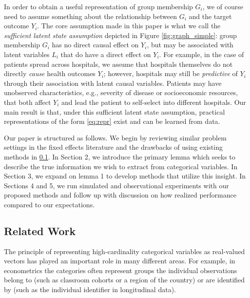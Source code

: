 \documentclass{article}
\theoremstyle{plain}
\theoremstyle{definition}
\theoremstyle{remark}
\begin{document}
In order to obtain a useful representation of group membership $G_i$, we of course need to assume
something about the relationship between $G_i$ and the target outcome $Y_i$. The core assumption
made in this paper is what we call the \emph{sufficient latent state assumption} depicted in Figure
\ref{fig:graph_simple}: group membership $G_i$ has no direct causal effect on $Y_i$, but may be
associated with latent variables $L_i$ that do have a direct effect on $Y_i$.
For example, in the case of patients spread across hospitals, we assume that hospitals themselves do not
directly \emph{cause} health outcomes $Y_i$; however, hospitals may still be \emph{predictive} of
$Y_i$ through their association with latent causal variables. Patients may have unobserved
characteristics, e.g., severity of disease or socioeconomic resources, that both affect $Y_i$ and lead the
patient to self-select into different hospitals. Our main result is that, under this sufficient latent state
assumption, practical representations of the form \eqref{eq:repr} exist and can be learned from data.

Our paper is structured as follows. We begin by reviewing similar problem settings in the fixed effects literature and the drawbacks of using existing methods in \ref{subsec:related_work}. In Section 2, we introduce the primary lemma which seeks to describe the true information we wish to extract from categorical variables. In Section 3, we expand on lemma 1 to develop methods that utilize this insight. In Sections 4 and 5, we run simulated and observational experiments with our proposed methods and follow up with discussion on how realized performance compared to our expectations.


\subsection{Related Work}
\label{subsec:related_work}

The principle of representing high-cardinality categorical variables as real-valued vectors has played an important role in many different areas. For example, in econometrics the categories often represent groups the individual observations belong to (such as classroom cohorts or a region of the country) or are identified by (such as the individual identifier in longitudinal data).
\end{document}
